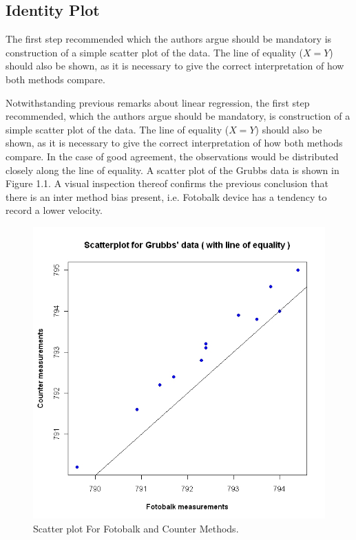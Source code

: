 \documentclass[Main.tex]{subfiles}
\begin{document}
	
\subsection{Identity Plot}
The first step recommended which the authors argue should be mandatory is construction of a simple scatter plot of the data.
The line of equality ($X=Y$) should also be shown, as it is	necessary to give the correct interpretation of how both methods
compare. 

Notwithstanding previous remarks about linear regression, the first step recommended, which the authors argue should be mandatory, is construction of a simple scatter plot of the data. The line of equality ($X=Y$) should also be shown, as it is necessary to give the correct interpretation of how both methods compare. In the case of good agreement, the observations would be distributed closely along the line of equality. A scatter plot of the Grubbs data is shown in Figure 1.1. A visual inspection thereof confirms the previous conclusion that there is an inter method bias present, i.e. Fotobalk device has a tendency to record a lower velocity.

\begin{figure}[h!]
	\begin{center}
		\includegraphics[width=130mm]{images/GrubbsScatter.jpeg}
		\caption{Scatter plot For Fotobalk and Counter Methods.}\label{GrubbsScatter}
	\end{center}
\end{figure}
\end{document}
